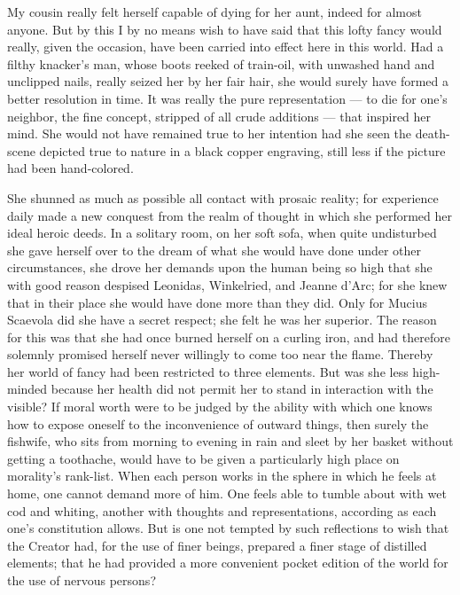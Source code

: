 \documentclass[12pt]{article}
\newcommand{\opage}[1]{\marginnote{\footnotesize\textit{[#1]}}}
\begin{document}
My cousin really felt herself capable of dying for her aunt, indeed for almost
anyone. But by this I by no means wish to have said that this lofty fancy would
really, given the occasion, have been carried into effect here in this world. Had
a filthy knacker's man, whose boots reeked of train-oil, with unwashed hand and
unclipped nails, really seized her by her fair hair, she would surely have formed
a better resolution in time. It was really the pure representation --- to die for
one's neighbor, the fine concept, stripped of all crude additions --- that
inspired her mind. She would not have remained true to her intention had she seen
the death-scene depicted true to nature in a black copper engraving, still less if
the picture had been hand-colored.

She shunned as much as possible all contact with \opage{7}prosaic reality; for
experience daily made a new conquest from the realm of thought in which she
performed her ideal heroic deeds. In a solitary room, on her soft sofa, when quite
undisturbed she gave herself over to the dream of what she would have done under
other circumstances, she drove her demands upon the human being so high that she
with good reason despised Leonidas, Winkelried, and Jeanne d'Arc; for she knew
that in their place she would have done more than they did. Only for Mucius
Scaevola did she have a secret respect; she felt he was her superior. The reason
for this was that she had once burned herself on a curling iron, and had therefore
solemnly promised herself never willingly to come too near the flame. Thereby her
world of fancy had been restricted to three elements. But was she less high-minded
because her health did not permit her to stand in interaction with the visible? If
moral worth were to be judged by the ability with which one knows how to expose
oneself to the inconvenience of outward things, then surely the fishwife, who sits
from morning to evening in rain and sleet by her basket without getting a
toothache, would have to be given a particularly high place on morality's
rank-list. When each person works in the sphere in which he feels at home, one
cannot demand more of him. One feels able to tumble about with wet cod and
whiting, another with thoughts and representations, according as each one's
constitution allows. But is one not tempted by such reflections to wish that the
Creator had, for the use of finer beings, prepared a finer stage of distilled
elements; that he had provided a more convenient pocket edition of the world for
the use of nervous persons?
\end{document}
